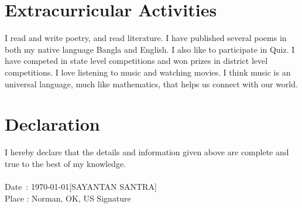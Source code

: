 \documentclass{article}
\begin{document}
\section*{Extracurricular Activities}
I read and write poetry, and read literature. I have published several poems in both my native language Bangla and English. I also like to participate in Quiz. I have competed in state level competitions and won prizes in district level competitions. I love listening to music and watching movies. I think music is an universal language, much like mathematics, that helps us connect with our world.
\section*{Declaration}
I hereby declare that the details and information given above are complete and true to the best of my knowledge. \\
\vspace{2cm} \\
Date \,: \today \hfill [SAYANTAN SANTRA] \\
Place  : Norman, OK, US \hfill Signature \hspace{1cm} \\
\end{document}
